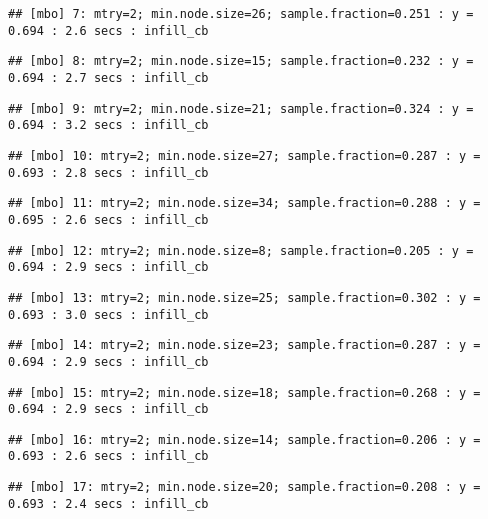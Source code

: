 \documentclass[
]{article}
\begin{document}
\begin{verbatim}
## [mbo] 7: mtry=2; min.node.size=26; sample.fraction=0.251 : y = 0.694 : 2.6 secs : infill_cb
\end{verbatim}

\begin{verbatim}
## [mbo] 8: mtry=2; min.node.size=15; sample.fraction=0.232 : y = 0.694 : 2.7 secs : infill_cb
\end{verbatim}

\begin{verbatim}
## [mbo] 9: mtry=2; min.node.size=21; sample.fraction=0.324 : y = 0.694 : 3.2 secs : infill_cb
\end{verbatim}

\begin{verbatim}
## [mbo] 10: mtry=2; min.node.size=27; sample.fraction=0.287 : y = 0.693 : 2.8 secs : infill_cb
\end{verbatim}

\begin{verbatim}
## [mbo] 11: mtry=2; min.node.size=34; sample.fraction=0.288 : y = 0.695 : 2.6 secs : infill_cb
\end{verbatim}

\begin{verbatim}
## [mbo] 12: mtry=2; min.node.size=8; sample.fraction=0.205 : y = 0.694 : 2.9 secs : infill_cb
\end{verbatim}

\begin{verbatim}
## [mbo] 13: mtry=2; min.node.size=25; sample.fraction=0.302 : y = 0.693 : 3.0 secs : infill_cb
\end{verbatim}

\begin{verbatim}
## [mbo] 14: mtry=2; min.node.size=23; sample.fraction=0.287 : y = 0.694 : 2.9 secs : infill_cb
\end{verbatim}

\begin{verbatim}
## [mbo] 15: mtry=2; min.node.size=18; sample.fraction=0.268 : y = 0.694 : 2.9 secs : infill_cb
\end{verbatim}

\begin{verbatim}
## [mbo] 16: mtry=2; min.node.size=14; sample.fraction=0.206 : y = 0.693 : 2.6 secs : infill_cb
\end{verbatim}

\begin{verbatim}
## [mbo] 17: mtry=2; min.node.size=20; sample.fraction=0.208 : y = 0.693 : 2.4 secs : infill_cb
\end{verbatim}
\end{document}
